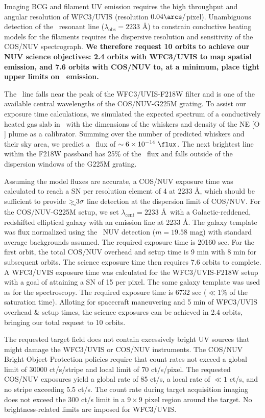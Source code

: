 \documentclass[11pt]{article}
\begin{document}
 Imaging BCG and filament UV emission requires the
high throughput and angular resolution of WFC3/UVIS (resolution
$0.04\arcs/$pixel). Unambiguous detection of the \civ\ resonant line
($\lambda_{\mathrm{obs}} = 2233$ \AA) to constrain conductive heating
models for the filaments requires the dispersive resolution and
sensitivity of the COS/NUV spectrograph. {\bf{We therefore request 10
    orbits to achieve our NUV science objectives: 2.4 orbits with
    WFC3/UVIS to map spatial emission, and 7.6 orbits with COS/NUV to,
    at a minimum, place tight upper limits on \civ\ emission.}}

The \civ\ line falls near the peak of the WFC3/UVIS-F218W filter and
is one of the available central wavelengths of the COS/NUV-G225M
grating. To assist our exposure time calculations, we simulated the
expected spectrum of a conductively heated gas slab in \cloudy\ with
the dimensions of the whiskers and density of the NE [O ]
plume as a calibrator. Summing over the number of predicted whiskers
and their sky area, we predict a \civ\ flux of $\sim 6\times10^{-14}
~\flux$. The next brightest line within the F218W passband has 25\% of
the \civ\ flux and falls outside of the dispersion windows of the
G225M grating.

Assuming the model fluxes are accurate, a COS/NUV exposure time was
calculated to reach a SN per resolution element of 4 at 2233 \AA,
which should be sufficient to provide $\ga 3\sigma$ line detection at
the dispersion limit of COS/NUV. For the COS/NUV-G225M setup, we set
$\lambda_{\mathrm{cent}} = 2233$ \AA\ with a Galactic-reddened,
redshifted elliptical galaxy with an emission line at 2233 \AA. The
galaxy template was flux normalized using the \galex\ NUV detection
($m = 19.58$ mag) with standard average backgrounds assumed. The
required exposure time is 20160 sec. For the first orbit, the total
COS/NUV overhead and setup time is 9 min with 8 min for subsequent
orbits. The science exposure time then requires 7.6 orbits to
complete. A WFC3/UVIS exposure time was calculated for the
WFC3/UVIS-F218W setup with a goal of attaining a SN of 15 per
pixel. The same galaxy template was used as for the spectroscopy. The
required exposure time is 6732 sec ($\ll 1\%$ of the saturation
time). Alloting for spacecraft maneuvering and 5 min of WFC3/UVIS
overhead \& setup times, the science exposures can be achieved in 2.4
orbits, bringing our total request to 10 orbits.

The requested target field does not contain excessively bright UV
sources that might damage the WFC3/UVIS or COS/NUV instruments. The
COS/NUV Bright Object Protection policies require that count rates not
exceed a global limit of 30000 ct/s/stripe and local limit of 70
ct/s/pixel. The requested COS/NUV exposures yield a global rate of 85
ct/s, a local rate of $\ll 1$ ct/s, and no stripe exceeding 5.5
ct/s. The count rate during target acquisition imaging does not exceed
the 300 ct/s limit in a $9 \times 9$ pixel region around the
target. No brightness-related limits are imposed for WFC3/UVIS.
\end{document}
